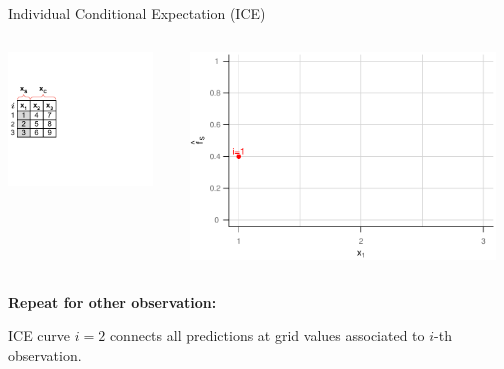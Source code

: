 \documentclass[11pt,compress,t,notes=noshow, aspectratio=169, xcolor=table]{beamer}
\begin{document}
\begin{frame}{Individual Conditional Expectation (ICE)}

\begin{columns}[T]
\begin{column}{0.4\textwidth}
\includegraphics[page=6, trim=0cm 0.35cm 0.85cm 0.35cm, width=0.9\textwidth]{figure_man/ice_plot_demo}
\end{column}
\begin{column}{0.55\textwidth}
\includegraphics[page=4, width=0.95\textwidth]{figure/ICE}
\end{column}
\end{columns}

\textbf{Repeat for other observation:}

ICE curve $i=2$ connects all predictions at grid values associated to $i$-th observation.
\end{frame}
\end{document}
